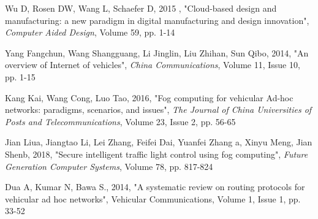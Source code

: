 \documentclass[10pt,a4paper,journal]{IEEEtran}
\begin{document}
\begin{thebibliography}{15}
 Wu D, Rosen DW, Wang L, Schaefer D, 2015 , "Cloud-based design and manufacturing: a new paradigm in digital manufacturing and design innovation", \textit{Computer Aided Design}, Volume 59, pp. 1-14

 Yang Fangchun, Wang Shangguang, Li Jinglin, Liu Zhihan, Sun Qibo, 2014, "An overview of Internet of vehicles", \textit{China Communications}, Volume 11, Issue 10, pp. 1-15

 Kang Kai, Wang Cong, Luo Tao, 2016, "Fog computing for vehicular Ad-hoc networks: paradigms, scenarios, and issues", \textit{The Journal of China Universities of Posts and Telecommunications}, Volume 23, Issue 2, pp. 56-65

 Jian Liua, Jiangtao Li, Lei Zhang, Feifei Dai, Yuanfei Zhang a, Xinyu Meng, Jian Shenb, 2018, "Secure intelligent traffic light control using fog computing", \textit{Future Generation Computer Systems}, Volume 78, pp. 817-824

 Dua A, Kumar N, Bawa S., 2014, "A systematic review on routing protocols for vehicular ad hoc networks",  Vehicular Communications, Volume 1, Issue 1, pp. 33-52

\end{thebibliography}



% 
% 
%
\end{document}
